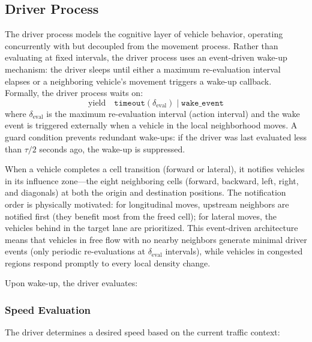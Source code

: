 \documentclass[review,authoryear]{elsarticle}
\begin{document}
\subsection{Driver Process}
\label{sec:driver}

The driver process models the cognitive layer of vehicle behavior, operating concurrently with but decoupled from the movement process. Rather than evaluating at fixed intervals, the driver process uses an event-driven wake-up mechanism: the driver sleeps until either a maximum re-evaluation interval elapses or a neighboring vehicle's movement triggers a wake-up callback. Formally, the driver process waits on:
\begin{equation}
    \text{yield} \quad \texttt{timeout}(\delta_{\text{eval}}) \;\big|\; \texttt{wake\_event}
    \label{eq:driver_yield}
\end{equation}
where $\delta_{\text{eval}}$ is the maximum re-evaluation interval (action interval) and the wake event is triggered externally when a vehicle in the local neighborhood moves. A guard condition prevents redundant wake-ups: if the driver was last evaluated less than $\tau/2$ seconds ago, the wake-up is suppressed.

When a vehicle completes a cell transition (forward or lateral), it notifies vehicles in its influence zone---the eight neighboring cells (forward, backward, left, right, and diagonals) at both the origin and destination positions. The notification order is physically motivated: for longitudinal moves, upstream neighbors are notified first (they benefit most from the freed cell); for lateral moves, the vehicles behind in the target lane are prioritized. This event-driven architecture means that vehicles in free flow with no nearby neighbors generate minimal driver events (only periodic re-evaluations at $\delta_{\text{eval}}$ intervals), while vehicles in congested regions respond promptly to every local density change.

Upon wake-up, the driver evaluates:

\subsubsection{Speed Evaluation}
\label{sec:speed_eval}

The driver determines a desired speed based on the current traffic context:
\end{document}
